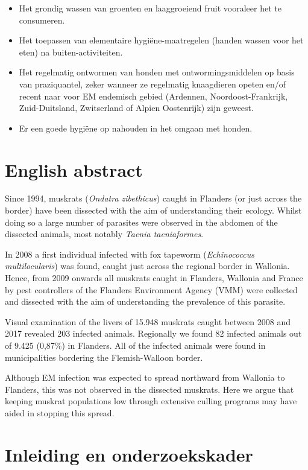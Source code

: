 \documentclass[twoside]{extreport}
\begin{document}
\begin{itemize}
\tightlist
\item
  Het grondig wassen van groenten en laaggroeiend fruit vooraleer het te
  consumeren.
\item
  Het toepassen van elementaire hygiëne-maatregelen (handen wassen voor
  het eten) na buiten-activiteiten.
\item
  Het regelmatig ontwormen van honden met ontwormingsmiddelen op basis
  van praziquantel, zeker wanneer ze regelmatig knaagdieren opeten en/of
  recent naar voor EM endemisch gebied (Ardennen, Noordoost-Frankrijk,
  Zuid-Duitsland, Zwitserland of Alpien Oostenrijk) zijn geweest.
\item
  Er een goede hygiëne op nahouden in het omgaan met honden.
\end{itemize}

\chapter*{English abstract}\label{english-abstract}

Since 1994, muskrats (\emph{Ondatra zibethicus}) caught in Flanders (or
just across the border) have been dissected with the aim of
understanding their ecology. Whilst doing so a large number of parasites
were observed in the abdomen of the dissected animals, most notably
\emph{Taenia taeniaformes}.

In 2008 a first individual infected with fox tapeworm
(\emph{Echinococcus multilocularis}) was found, caught just across the
regional border in Wallonia. Hence, from 2009 onwards all muskrats
caught in Flanders, Wallonia and France by pest controllers of the
Flanders Environment Agency (VMM) were collected and dissected with the
aim of understanding the prevalence of this parasite.

Visual examination of the livers of 15.948 muskrats caught between 2008
and 2017 revealed 203 infected animals. Regionally we found 82 infected
animals out of 9.425 (0,87\%) in Flanders. All of the infected animals
were found in municipalities bordering the Flemish-Walloon border.

Although EM infection was expected to spread northward from Wallonia to
Flanders, this was not observed in the dissected muskrats. Here we argue
that keeping muskrat populations low through extensive culling programs
may have aided in stopping this spread.

\chapter{Inleiding en
onderzoekskader}\label{inleiding-en-onderzoekskader}
\end{document}
